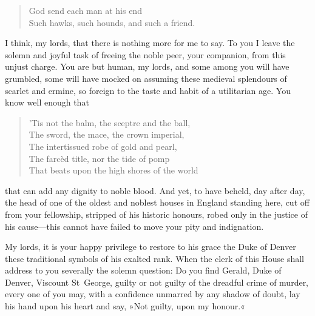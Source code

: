 \begin{dialogue}
\begin{verse}
God send each man at his end\\
Such hawks, such hounds, and such a friend.\\
\end{verse}


I think, my lords, that there is nothing more for me to say. To you I leave the solemn and joyful task of freeing the noble peer, your companion, from this unjust charge. You are but human, my lords, and some among you will have grumbled, some will have mocked on assuming these medieval splendours of scarlet and ermine, so foreign to the taste and habit of a utilitarian age. You know well enough that

\begin{verse}
'Tis not the balm, the sceptre and the ball,\\
The sword, the mace, the crown imperial,\\
The intertissued robe of gold and pearl,\\
The farcèd title, nor the tide of pomp\\
That beats upon the high shores of the world\\
\end{verse}

that can add any dignity to noble blood. And yet, to have beheld, day after day, the head of one of the oldest and noblest houses in England standing here, cut off from your fellowship, stripped of his historic honours, robed only in the justice of his cause—this cannot have failed to move your pity and indignation.

\smallskip

My lords, it is your happy privilege to restore to his grace the Duke of Denver these traditional symbols of his exalted rank. When the clerk of this House shall address to you severally the solemn question: Do you find Gerald, Duke of Denver, Viscount St~George, guilty or not guilty of the dreadful crime of murder, every one of you may, with a confidence unmarred by any shadow of doubt, lay his hand upon his heart and say, »Not guilty, upon my honour.«

\end{dialogue}

